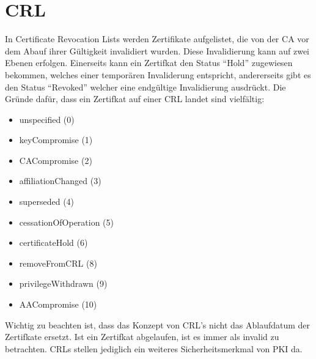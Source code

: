 \section{CRL}
In Certificate Revocation Lists werden Zertifikate aufgelistet, die von der CA vor dem Abauf ihrer Gültigkeit invalidiert wurden. Diese Invalidierung kann auf zwei Ebenen erfolgen. Einerseits kann ein Zertifkat den Status ``Hold'' zugewiesen bekommen, welches einer temporären Invaliderung entspricht, andererseits gibt es den Status ``Revoked'' welcher eine endgültige Invalidierung ausdrückt. Die Gründe dafür, dass ein Zertifkat auf einer CRL landet sind vielfältig:
\begin{itemize}
  \item unspecified (0)
  \item keyCompromise (1)
  \item CACompromise (2)
  \item affiliationChanged (3)
  \item superseded (4)
  \item cessationOfOperation (5)
  \item certificateHold (6)
  \item removeFromCRL (8)
  \item privilegeWithdrawn (9)
  \item AACompromise (10)
\end{itemize}
Wichtig zu beachten ist, dass das Konzept von CRL's nicht das Ablaufdatum der Zertifkate ersetzt. Ist ein Zertifkat abgelaufen, ist es immer als invalid zu betrachten. CRLs stellen jediglich ein weiteres Sicherheitsmerkmal von PKI da.
